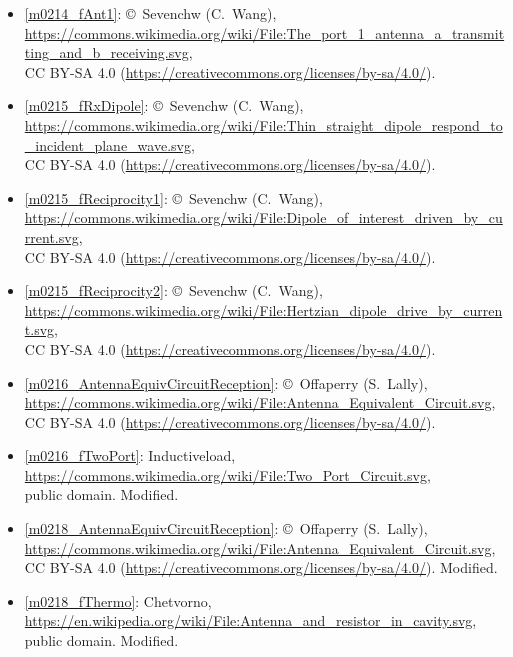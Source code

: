 \begin{itemize}
\item[Fig.] \label{m0214_fAnt1_Credit}
  \ref{m0214_fAnt1}:
  \copyright~Sevenchw (C.\ Wang), 
  \url{https://commons.wikimedia.org/wiki/File:The_port_1_antenna_a_transmitting_and_b_receiving.svg},\\ 
  CC BY-SA 4.0 (\url{https://creativecommons.org/licenses/by-sa/4.0/}).

\item[Fig.] \label{m0215_fRxDipole_Credit}
  \ref{m0215_fRxDipole}:
  \copyright~Sevenchw (C.\ Wang), 
  \url{https://commons.wikimedia.org/wiki/File:Thin_straight_dipole_respond_to_incident_plane_wave.svg},\\ 
  CC BY-SA 4.0 (\url{https://creativecommons.org/licenses/by-sa/4.0/}).

\item[Fig.] \label{m0215_fReciprocity1_Credit}
  \ref{m0215_fReciprocity1}:
  \copyright~Sevenchw (C.\ Wang), 
  \url{https://commons.wikimedia.org/wiki/File:Dipole_of_interest_driven_by_current.svg},\\ 
  CC BY-SA 4.0 (\url{https://creativecommons.org/licenses/by-sa/4.0/}).

\item[Fig.] \label{m0215_fReciprocity2_Credit}
  \ref{m0215_fReciprocity2}:
  \copyright~Sevenchw (C.\ Wang), 
  \url{https://commons.wikimedia.org/wiki/File:Hertzian_dipole_drive_by_current.svg},\\ 
  CC BY-SA 4.0 (\url{https://creativecommons.org/licenses/by-sa/4.0/}).

\item[Fig.] \label{m0216_AntennaEquivCircuitReception_Credit}
  \ref{m0216_AntennaEquivCircuitReception}:
  \copyright~Offaperry (S.\ Lally), 
  \url{https://commons.wikimedia.org/wiki/File:Antenna_Equivalent_Circuit.svg},\\ 
  CC BY-SA 4.0 (\url{https://creativecommons.org/licenses/by-sa/4.0/}).

\item[Fig.] \label{m0216_fTwoPort_Credit}
  \ref{m0216_fTwoPort}:
  Inductiveload, 
  \url{https://commons.wikimedia.org/wiki/File:Two_Port_Circuit.svg},\\ 
  public domain.
  Modified.

\item[Fig.] \label{m0218_AntennaEquivCircuitReception_Credit}
  \ref{m0218_AntennaEquivCircuitReception}:
  \copyright~Offaperry (S.\ Lally), 
  \url{https://commons.wikimedia.org/wiki/File:Antenna_Equivalent_Circuit.svg},\\ 
  CC BY-SA 4.0 (\url{https://creativecommons.org/licenses/by-sa/4.0/}).
  Modified.

\item[Fig.] \label{m0218_fThermo_Credit}
  \ref{m0218_fThermo}:
  Chetvorno, 
  \url{https://en.wikipedia.org/wiki/File:Antenna_and_resistor_in_cavity.svg},\\ 
  public domain.
  Modified.

\end{itemize}

\twocolumn
